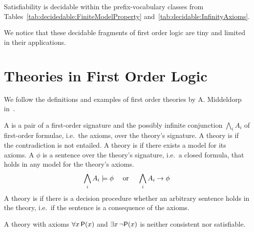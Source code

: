 \begin{lemma}[\cite{MR1482227}]
	Satisfiability is decidable within the prefix-vocabulary classes from
	Tables~\ref{tab:decidedable:FiniteModelProperty} and~\vref{tab:decidable:InfinityAxioms}.
\end{lemma}

\noindent We notice that these decidable fragments of first order logic are 
tiny and limited in their applications.



\section{Theories in First Order Logic}\label{sec:decidable:fol:theories}

We follow the definitions and examples of first order theories
by A. Middeldorp in~\cite{AM2015L}.

\begin{definition}[Theory]
	A  is a pair of a first-order signature
	and the possibly infinite conjunction \( \bigwedge_i A_i \) of first-order formulae,
	i.e.~the axioms, over the theory's signature.
	A theory is  if the contradiction is not entailed.
	A theory is  if there exists a model for its axioms.
%
	A  \( \phi \) is a sentence over the theory's signature,
	i.e.~a closed formula, that holds in any model for the theory's axioms.
	\[
		\bigwedge_i A_i \models \phi
		\quad\text{ or }\quad
		\bigwedge_i A_i \rightarrow \phi
	\]
	A theory is  if there is a decision procedure whether an arbitrary sentence holds in the theory, i.e.~if the sentence is a consequence of the axioms.
\end{definition}
%
\begin{example}
A theory with axioms \( \forall x\,\mathsf{P}(x) \) and \( \exists x\,\lnot\mathsf{P}(x) \) is neither consistent nor satisfiable.
\end{example}

